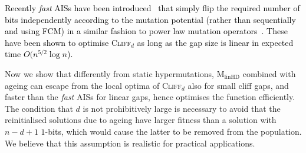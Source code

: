 \documentclass[lettersize,journal]{IEEEtran}
\newcommand{\rerev}[1]{\textcolor{black}{#1}}
\newcommand{\cliff}{\textsc{Cliff}$_d$}
\newcommand{\linHD}{M$_{\text{linHD}}$}
\begin{document}
\textcolor{black}{Recently {\it fast} AISs have been introduced~\cite{CorusOlivetoYazdani2021TEVC} that simply flip the required number of bits independently according to the mutation potential (rather than sequentially and using FCM) in a similar fashion to power law mutation operators~\cite{DoerrGECCO2017FastGA}. These have been shown to optimise \cliff{} as long as the gap size is linear in expected time $O(n^{5/2} \log n$).
}

Now we show that differently from static hypermutations, {\linHD }
combined with ageing can escape from the local optima of \cliff{} also for small cliff gaps, and faster than the {\it fast} AISs for \rerev{linear} gaps, 
hence optimises the function efficiently. The condition that $d$ is not prohibitively large is necessary to avoid
that the reinitialised solutions due to ageing have larger fitness than a solution with $n-d+1$ $1$-bits, {\color{black} which would cause the latter to be removed from the population}.
We believe that this assumption is realistic for practical applications. 
\end{document}
